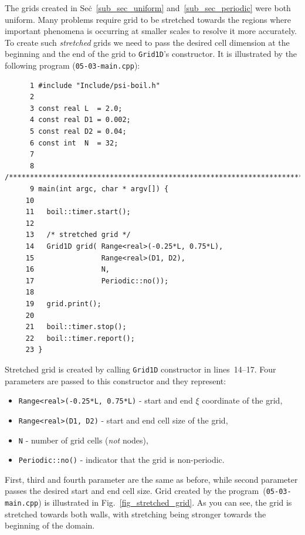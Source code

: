 The grids created in Sec\.~\ref{sub_sec_uniform} and~\ref{sub_sec_periodic}
were both uniform. Many problems require grid to be stretched towards
the regions where important phenomena is occurring at smaller scales to
resolve it more accurately. To create such {\em stretched} grids we need
to pass the desired cell dimension at the beginning and the end of the grid
to {\tt Grid1D}'s constructor. It is illustrated by the following program 
({\tt 05-03-main.cpp}):
%
{\small \begin{verbatim}
      1 #include "Include/psi-boil.h"
      2
      3 const real L  = 2.0;
      4 const real D1 = 0.002;
      5 const real D2 = 0.04;
      6 const int  N  = 32;
      7
      8 /****************************************************************************/
      9 main(int argc, char * argv[]) {
     10
     11   boil::timer.start();
     12
     13   /* stretched grid */
     14   Grid1D grid( Range<real>(-0.25*L, 0.75*L),
     15                Range<real>(D1, D2),
     16                N,
     17                Periodic::no());
     18
     19   grid.print();
     20
     21   boil::timer.stop();
     22   boil::timer.report();
     23 }
\end{verbatim}}
%
Stretched grid is created by calling {\tt Grid1D} constructor in lines~14--17. 
Four parameters are passed to this constructor and they represent:
%
\begin{itemize}
  \item {\tt Range<real>(-0.25*L, 0.75*L)} - start and end $\xi$ coordinate of the grid,
  \item {\tt Range<real>(D1, D2)}          - start and end cell size of the grid,
  \item {\tt N}                            - number of grid cells ({\em not} nodes),
  \item {\tt Periodic::no()}               - indicator that the grid is non-periodic.
\end{itemize}
%
First, third and fourth parameter are the same as before, while second
parameter passes the desired start and end cell size. Grid created by
the program~({\tt 05-03-main.cpp}) is illustrated in Fig.~\ref{fig_stretched_grid}. 
As you can see, the grid is stretched towards both walls, with stretching
being stronger towards the beginning of the domain.


